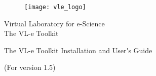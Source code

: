 %
% 

\begin{center}
\begin{figure}[htbp]
\centerline{\texttt{[image: vle\_logo]}}
\end{figure}

\vspace{2cm} 

{\Large Virtual Laboratory for e-Science}\\
{\Large The VL-e Toolkit}\\ 

\vspace{1cm} 
 
{\Huge The VL-e Toolkit Installation and User\'{}s Guide}\\ 

\vspace{1cm} 

{(For version 1.5)}\\
\vspace{0.5cm} 
\vspace{0.5cm} 

\\
\\
\end{center}

